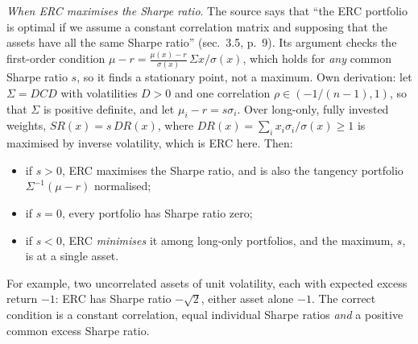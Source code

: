 \begin{qfmethod}
\emph{When ERC maximises the Sharpe ratio}. The source says that ``the ERC portfolio is optimal if we assume a constant correlation matrix and supposing that the assets have all the same Sharpe ratio'' (sec.~3.5, p.~9). Its argument checks the first-order condition $\mu-r=\frac{\mu(x)-r}{\sigma(x)}\,\Sigma x/\sigma(x)$, which holds for \emph{any} common Sharpe ratio $s$, so it finds a stationary point, not a maximum. Own derivation: let $\Sigma=DCD$ with volatilities $D>0$ and one correlation $\rho\in(-1/(n-1),1)$, so that $\Sigma$ is positive definite, and let $\mu_i-r=s\sigma_i$. Over long-only, fully invested weights, $SR(x)=s\,DR(x)$, where $DR(x)=\sum_ix_i\sigma_i/\sigma(x)\ge1$ is maximised by inverse volatility, which is ERC here. Then:
\begin{itemize}
\item if $s>0$, ERC maximises the Sharpe ratio, and is also the tangency portfolio $\Sigma^{-1}(\mu-r)$ normalised;
\item if $s=0$, every portfolio has Sharpe ratio zero;
\item if $s<0$, ERC \emph{minimises} it among long-only portfolios, and the maximum, $s$, is at a single asset.
\end{itemize}
For example, two uncorrelated assets of unit volatility, each with expected excess return $-1$: ERC has Sharpe ratio $-\sqrt2$, either asset alone $-1$. The correct condition is a constant correlation, equal individual Sharpe ratios \emph{and} a positive common excess Sharpe ratio.


\end{qfmethod}
